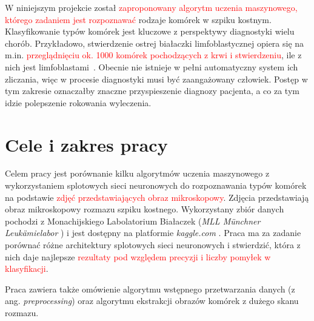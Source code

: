 W niniejszym projekcie został \textcolor{red}{zaproponowany algorytm uczenia maszynowego, którego zadaniem jest rozpoznawać} rodzaje komórek w szpiku kostnym.
Klasyfikowanie typów komórek jest kluczowe z perspektywy diagnostyki wielu chorób.
Przykładowo, stwierdzenie ostrej białaczki limfoblastycznej opiera się na m.in.
\textcolor{red}{przeglądnięciu ok. 1000 komórek pochodzących z krwi i stwierdzeniu}, ile z nich jest limfoblastami~\cite{blast_counting_diagnosis}.
Obecnie nie istnieje w pełni automatyczny system ich zliczania, więc w procesie diagnostyki musi być zaangażowany człowiek.
Postęp w tym zakresie oznaczałby znaczne przyspieszenie diagnozy pacjenta, a co za tym idzie polepszenie rokowania wyleczenia.


\section{Cele i zakres pracy}

Celem pracy jest porównanie kilku algorytmów uczenia maszynowego z wykorzystaniem splotowych sieci neuronowych do rozpoznawania typów komórek na podstawie \textcolor{red}{zdjęć przedstawiających obraz mikroskopowy}.
Zdjęcia przedstawiają obraz mikroskopowy rozmazu szpiku kostnego. Wykorzystany zbiór danych pochodzi z
Monachijskiego Labolatorium Białaczek (\textit{MLL Münchner Leukämielabor} \cite{mll}) i jest dostępny na platformie \textit{kaggle.com} \cite{dataset}.
Praca ma za zadanie porównać różne architektury splotowych sieci neuronowych i stwierdzić, która z nich daje najlepsze \textcolor{red}{rezultaty pod względem precyzji i liczby pomyłek w klasyfikacji}.

Praca zawiera także omówienie algorytmu wstępnego przetwarzania danych (z ang. \textit{preprocessing}) oraz algorytmu ekstrakcji obrazów komórek z dużego skanu rozmazu.
